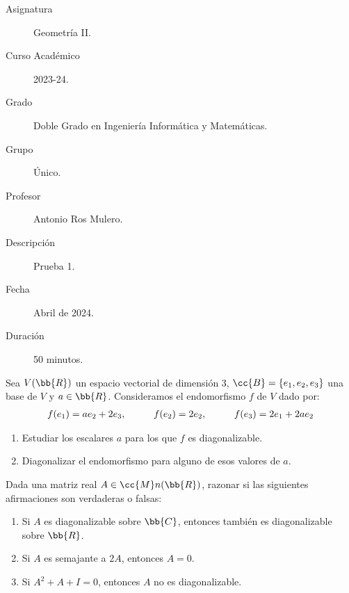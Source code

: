 \documentclass[12pt]{article}
\begin{document}

    
    

    \begin{description}
        \item[Asignatura] Geometría II.
        \item[Curso Académico] 2023-24.
        \item[Grado] Doble Grado en Ingeniería Informática y Matemáticas.
        \item[Grupo] Único.
        \item[Profesor] Antonio Ros Mulero.
        \item[Descripción] Prueba 1.
        \item[Fecha] Abril de 2024.
        \item[Duración] 50 minutos.
    \end{description}
    \newpage

    \begin{ejercicio}
        Sea $V(\bb{R})$ un espacio vectorial de dimensión 3, $\cc{B}=\{e_1,e_2,e_3\}$ una base de $V$ y $a \in \bb{R}$. Consideramos el endomorfismo $f$ de $V$ dado por:
        \begin{gather*}
            f(e_1)=ae_2+2e_3, \hspace*{1cm} f(e_2)=2e_2, \hspace*{1cm} f(e_3)=2e_1+2ae_2
        \end{gather*}

        \begin{enumerate}
            \item Estudiar los escalares $a$ para los que $f$ es diagonalizable.
            \item Diagonalizar el endomorfismo para alguno de esos valores de $a$.
        \end{enumerate}
    \end{ejercicio}

    \begin{ejercicio}
        Dada una matriz real $A \in \cc{M}n (\bb{R})$, razonar si las siguientes afirmaciones son verdaderas o falsas:

        \begin{enumerate}
            \item Si $A$ es diagonalizable sobre $\bb{C}$, entonces también es diagonalizable sobre $\bb{R}$.
            \item Si $A$ es semajante a $2A$, entonces $A=0$.
            \item Si $A^2 + A + I = 0 $, entonces $A$ no es diagonalizable.
        \end{enumerate}
    \end{ejercicio}

   
\end{document}
